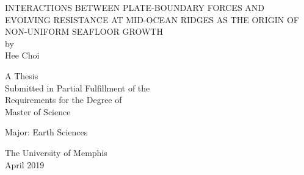 \begin{titlepage}

\vspace*{.66in}
\begin{center}\uppercase{
Interactions between plate-boundary forces and evolving resistance at mid-ocean ridges as the origin of non-uniform seafloor growth
}\vspace{2em}\\  %
by\\
\vspace{2em}  %
Hee Choi

\vspace{1.5in}
A Thesis \\
\vspace{14pt}
Submitted in Partial Fulfillment of the\\ \vspace{14pt}
Requirements for the Degree of\\ \vspace{14pt}
Master of Science
\vspace{0.5in}

Major: Earth Sciences

\vspace{1.66in}
The University of Memphis \\
\vspace{14pt}
April 2019
\end{center}

\end{titlepage} 
